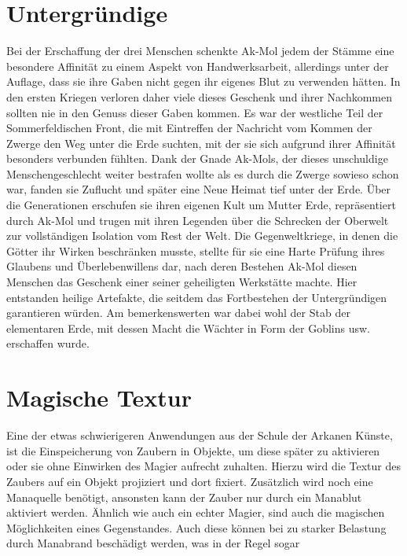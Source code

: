 \documentclass[a4paper,12pt,oneside]{book}
\begin{document}
\chapter{Untergründige}
Bei der Erschaffung der drei Menschen schenkte Ak-Mol jedem der Stämme eine besondere Affinität zu einem Aspekt von Handwerksarbeit, allerdings unter der Auflage, dass sie ihre Gaben nicht gegen ihr eigenes Blut zu verwenden hätten. In den ersten Kriegen verloren daher viele dieses Geschenk und ihrer Nachkommen sollten nie in den Genuss dieser Gaben kommen. Es war der westliche Teil der Sommerfeldischen Front, die mit Eintreffen der Nachricht vom Kommen der Zwerge den Weg unter die Erde suchten, mit der sie sich aufgrund ihrer Affinität besonders verbunden fühlten. Dank der Gnade Ak-Mols, der dieses unschuldige Menschengeschlecht weiter bestrafen wollte als es durch die Zwerge sowieso schon war, fanden sie Zuflucht und später eine Neue Heimat tief unter der Erde. Über die Generationen erschufen sie ihren eigenen Kult um Mutter Erde, repräsentiert durch Ak-Mol und trugen mit ihren Legenden über die Schrecken der Oberwelt zur vollständigen Isolation vom Rest der Welt. Die Gegenweltkriege, in denen die Götter ihr Wirken beschränken musste, stellte für sie eine Harte Prüfung ihres Glaubens und Überlebenwillens dar, nach deren Bestehen Ak-Mol diesen Menschen das Geschenk einer seiner geheiligten Werkstätte machte. Hier entstanden heilige Artefakte, die seitdem das Fortbestehen der Untergründigen garantieren würden. Am bemerkenswerten war dabei wohl der Stab der elementaren Erde, mit dessen Macht die Wächter in Form der Goblins usw. erschaffen wurde. 

\chapter{Magische Textur}
Eine der etwas schwierigeren Anwendungen aus der Schule der Arkanen Künste, ist die Einspeicherung von Zaubern in Objekte, um diese später zu aktivieren oder sie ohne Einwirken des Magier aufrecht zuhalten. Hierzu wird die Textur des Zaubers auf ein Objekt projiziert und dort fixiert. Zusätzlich wird noch eine Manaquelle benötigt, ansonsten kann der Zauber nur durch ein Manablut aktiviert werden. Ähnlich wie auch ein echter Magier, sind auch die magischen Möglichkeiten eines Gegenstandes. Auch diese können bei zu starker Belastung durch Manabrand beschädigt werden, was in der Regel sogar 

\cleardoublepage
{}
{}
\printindex[Stichworte]
{}
\printindex[Geographie]
\end{document}
